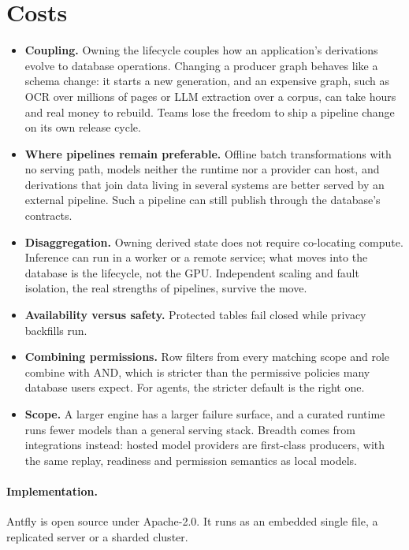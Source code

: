 \documentclass[sigconf,nonacm]{acmart}
\begin{document}
\section{Costs}
\label{sec:costs}

\begin{itemize}
  \item \textbf{Coupling.} Owning the lifecycle couples how an application's
    derivations evolve to database operations. Changing a producer graph
    behaves like a schema change: it starts a new generation, and an
    expensive graph, such as OCR over millions of pages or LLM extraction over
    a corpus, can take hours and real money to rebuild. Teams lose the
    freedom to ship a pipeline change on its own release cycle.
  \item \textbf{Where pipelines remain preferable.} Offline batch
    transformations with no serving path, models neither the runtime nor a
    provider can host, and derivations that join data living in several
    systems are better served by an external pipeline. Such a pipeline can
    still publish through the database's contracts.
  \item \textbf{Disaggregation.} Owning derived state does not require
    co-locating compute. Inference can run in a worker or a remote service;
    what moves into the database is the lifecycle, not the GPU. Independent
    scaling and fault isolation, the real strengths of pipelines, survive the
    move.
  \item \textbf{Availability versus safety.} Protected tables fail closed
    while privacy backfills run.
  \item \textbf{Combining permissions.} Row filters from every matching scope and
    role combine with AND, which is stricter than the permissive policies many
    database users expect. For agents, the stricter default is the right one.
  \item \textbf{Scope.} A larger engine has a larger failure surface, and a
    curated runtime runs fewer models than a general serving stack. Breadth
    comes from integrations instead: hosted model providers are first-class
    producers, with the same replay, readiness and permission semantics as
    local models.
\end{itemize}

\paragraph{Implementation.} Antfly is open source under Apache-2.0. It runs
as an embedded single file, a replicated server or a sharded cluster.
\end{document}
